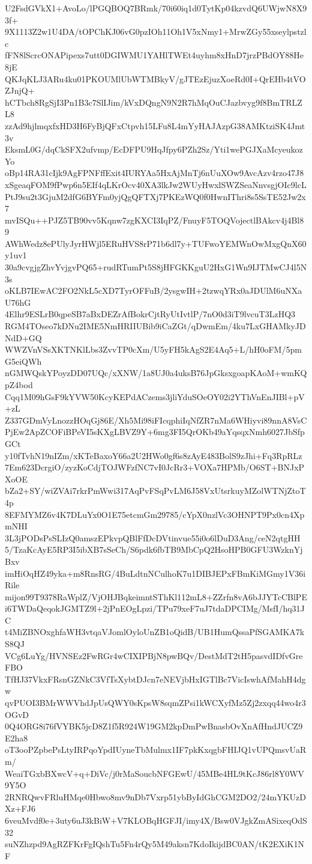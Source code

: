 U2FsdGVkX1+AvoLo/lPGQBOQ7BRmk/70i60iq1d0TytKp04kzvdQ6UWjwN8X93f+
9X1113Z2w1U4DA/tOPChKJ06vG0pzIOh11Oh1V5xNmy1+MrwZGy55xseylpstzlc
fFN8lScrcONAPipexs7utt0DGIWMU1YAHlTWEt4uyhm8xHnD7jrzPBdOY88He8jE
QKJqKLJ3ARu4ku01PKOUMlUbWTMBkyV/gJTEzEjuzXoeRd0I+QrEHb4tVOZJnjQ+
hCTbch8RgSjI3Pn1B3c7SlIJim/kVxDQngN9N2R7hMqOuCJazbvyg9f8BmTRLZL8
zzAd9hjlmqxfxHD3H6FyBjQFxCtpvh15LFu8L4mYyHAJAzpG38AMKtziSK4Jmt3v
EksmL0G/dqCkSFX2ufvmp/EcDFPU9HqJfpy6PZh2Sz/Yti1wePGJXaMcyeukozYo
oBp14RA31cIjk9AgFPNFffExit4IURYAa5HxAjMnTj6nUuXOw9AvcAzv4rzo47J8
xSgeaqFOM9fPwp6n5EIf4qLKrOcv40XA3lkJw2WUyHwxlSWZSeaNnvsgjOIc9lcL
PtJ9su2t3GjuM2dfG6BYFm0yjQgQFTXj7PKEzWQ0f0HwnIThri8s5SsTE52Jw2x7
mvISQu++PJZ5TB90vv5Kqnw7zgKXCI3IqPZ/FnuyF5TOQVojectlBAkcv4j4Bl89
AWhWedz8ePUlyJyrHWjl5ERuHVS8rP71b6dl7y+TUFwoYEMWnOwMxgQnX60y1uv1
30a9cvgjgZhvYvjgvPQ65+rudRTumPt5S8jHFGKKguU2HxG1Wn9IJTMwCJ4l5N3s
oKLB7IEwAC2FO2NkL5cXD7TyrOFFuB/2ysgwIH+2tzwqYRx0aJDUlM6uNXaU76hG
4Elhr9ESLrB0qpeSB7aBxDEZrAfBokrCjtRyUtIvtlP/7nO0d3iT9lvcuT3LzHQ3
RGM4TOseo7kDNu2IME5NmHRIIUBib9iCaZGt/qDwmEm/4ku7LxGHAMkyJDNdD+GQ
WWZVnVSsXKTNKlLbs3ZvvTP0cXm/U5yFH5kAgS2E4Aq5+L/hH0oFM/5pmG5eiQWh
nGMWQskYPoyzDD07UQc/xXNW/1a8UJ0a4uksB76JpGksxgoapKAoM+wmKQpZ4bod
Cqq1M09hGsF9kYVW50KcyKEPdACzems3jliYduSOeOY02i2YThVnEnJIBl+pV+zL
Z337GDmVyLnozzHOqGj86E/Xh5Mi98iFIcqphiIqNfZR7nMa6WHiyvi89nnA8VsC
PjEw2ApZCOFiBPeVI5sKXgLBVZ9Y+6mg3FI5QrOKb49aYqsqxNmh6027JbSfpGCt
y10fTvhN19nIZm/xKTeBaxoY66a2U2HWo0gf6s8zAyE483BolS9zJhi+Fq3RpRLz
7Em623DcrgiO/zyzKoCdjTOJWFzfNC7vI0JcRr3+VOXa7HPMb/O6ST+BNJxPXoOE
bZa2+SY/wiZVAi7rkrPmWwi317AqPvFSqPvLM6J58VxUtsrkuyMZolWTNjZtoT4p
8EFMYMZ6v4K7DLuYx0O1E75etcmGm29785/cYpX0nzlVc3OHNPT9Px0cn4XpmNHI
3L3jPODsPsSLIzQ0amszEPkvpQBlFfDcDVtinvue55i0o6lDuD3Ang/ceN2qtgHH
5/TzaKcAyE5RP3I5ibXB7sSeCh/S6pdk6fbTB9MbCpQ2HsoHPB0GFU3WzknYjBxv
imHiOqHZ49yka+m8RnsRG/4BuLdtnNCulhoK7u1DIBJEPxFBmKiMGmy1V36iRile
mijon99T9378RaWplZ/VjOHJBqkeimntSThKl112mL8+ZZrfn8vA6bJJYTcCBlPE
i6TWDaQeqokJGMTZ9l+2jPnEOgLpzi/TPu79xeF7uJ7tdaDPCIMg/MsfI/hq31JC
t4MiZBNOxghfaWH3vtqaVJomlOyloUnZB1oQidB/UB1HumQssaPfSGAMKA7kS8QJ
VCg6LuYg/HVNSEz2FwRGr4wCIXIPBjN8pwBQv/DestMdT2tH5pasvdIDfvGreFBO
TfHJ37VkxFRsnGZNkC3VfTsXybtDJcn7eNEVjbHxIGTlBc7VicIswhAfMahH4dgw
qvPUOI3BMrWWVhdJpUsQWY0sKpsW8sqmZPsi1kWCXyfMz5Zj2zxqq44wo4r3OGvD
0Q4ORG8i76fVYBK5jcD8Z1f5R924W19GM2kpDmPwBnasbOvXnAfHndJUCZ9E2ha8
oT3ooPZpbePsLtyIRPqoYpdIUyneTbMulmx1IF7pkKxqgbFHIJQ1vUPQmsvUaRm/
WeaiTGxbBXwcV+q+DiVc/j0rMaSoucbNFGEwU/45MBe4HL9tKcJ86rl8Y0WV9Y5O
2RNRQwvFRluHMqe0Hbwo8mv9nDb7Vxrp51ybByIdGhCGM2DO2/24mYKUzDXz+FJ6
6veuMvdf0e+3uty6uJ3kBiW+V7KLOBqHGFJI/imy4X/Bsw0VJgkZmASixeqOdS32
suNZhzpd9AgRZFKrFgIQshTu5Fn4rQy5M49aksn7KdoIkijdBC0AN/tK2EXiK1NF
